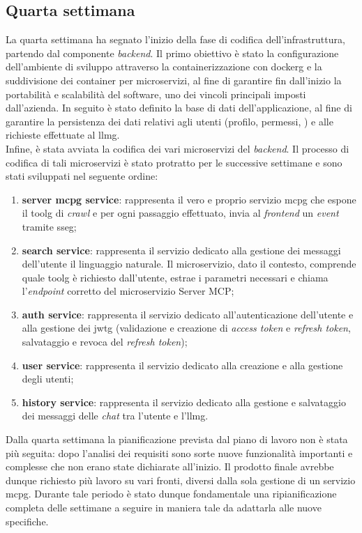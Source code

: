 \subsection{Quarta settimana}
La quarta settimana ha segnato l'inizio della fase di codifica dell'infrastruttura, 
partendo dal componente \textit{backend}. Il primo obiettivo è stato la 
configurazione dell'ambiente di sviluppo attraverso la containerizzazione 
con \gls{dockerg} e la suddivisione dei container per microservizi, 
al fine di garantire fin dall'inizio la portabilità e 
scalabilità del software, uno dei vincoli principali imposti dall'azienda.
In seguito è stato definito la base di dati dell'applicazione, al fine di 
garantire la persistenza dei dati relativi agli utenti (profilo, permessi, 
) e alle richieste effettuate al \gls{llmg}.
\\Infine, è stata avviata la codifica dei vari microservizi 
del \textit{backend}. Il processo di codifica di tali microservizi è 
stato protratto per le successive settimane e sono stati 
sviluppati nel seguente ordine:
\begin{enumerate}
    \item \textbf{server \gls{mcpg} service}: rappresenta il vero e proprio servizio \gls{mcpg} che espone il \gls{toolg} di \textit{crawl} e per ogni passaggio effettuato,
    invia al \textit{frontend} un \textit{event} tramite \gls{sseg};
    \item \textbf{search service}: rappresenta il servizio dedicato alla gestione dei messaggi dell'utente il linguaggio naturale. Il microservizio, dato il contesto, comprende quale \gls{toolg} è richiesto dall'utente, estrae i parametri necessari e chiama l'\textit{endpoint} corretto del microservizio Server MCP;
    \item \textbf{auth service}: rappresenta il servizio dedicato all'autenticazione dell'utente e alla gestione dei \gls{jwtg} (validazione e creazione di \textit{access token} e \textit{refresh token}, salvataggio e revoca del \textit{refresh token});
    \item \textbf{user service}: rappresenta il servizio dedicato alla creazione e 
    alla gestione degli utenti;
    \item \textbf{history service}: rappresenta il servizio dedicato alla gestione 
    e salvataggio dei messaggi delle \textit{chat} tra l'utente e l'\gls{llmg}.
\end{enumerate}
Dalla quarta settimana la pianificazione prevista dal piano di lavoro non è stata più 
seguita: dopo l'analisi dei requisiti sono sorte nuove funzionalità importanti e 
complesse che non erano state dichiarate all'inizio. Il prodotto finale avrebbe 
dunque richiesto più lavoro su vari fronti, diversi dalla sola gestione di un servizio 
\gls{mcpg}. Durante tale periodo è stato dunque fondamentale una ripianificazione 
completa delle settimane a seguire in maniera tale da adattarla alle nuove specifiche.

